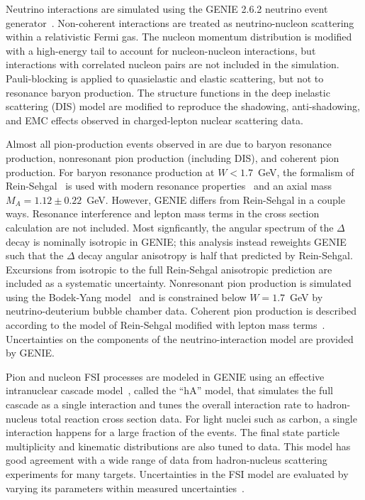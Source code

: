 Neutrino interactions are simulated using the GENIE 2.6.2 neutrino event generator~\cite{Andreopoulos201087}.  Non-coherent interactions 
are treated as neutrino-nucleon scattering within a relativistic Fermi gas.  The nucleon momentum distribution is 
modified with a high-energy tail to account for nucleon-nucleon interactions, but interactions with correlated 
nucleon pairs are not included in the simulation.  Pauli-blocking is applied to quasielastic and elastic scattering, but not to 
resonance baryon production.  The structure functions in the deep inelastic scattering (DIS) model are modified to reproduce 
the shadowing, anti-shadowing, and EMC effects observed in charged-lepton nuclear scattering data.

Almost all pion-production events observed in \minerva are due to baryon resonance production, nonresonant pion production (including DIS), 
and coherent pion production.  For baryon resonance production at $W<1.7$~GeV, the formalism of 
Rein-Sehgal~\cite{Rein:1980wg} is used with modern resonance properties~\cite{pdg} and an axial mass $M_{A}=1.12\pm0.22$~GeV.  
However, GENIE differs from Rein-Sehgal in a couple ways. Resonance interference and lepton mass terms in the 
cross section calculation are not included. 
Most signficantly, the angular spectrum of the $\Delta$ decay is nominally isotropic in GENIE; this analysis instead reweights GENIE such 
that the $\Delta$ decay angular anisotropy is half that predicted by 
Rein-Sehgal.  Excursions from isotropic to the full Rein-Sehgal anisotropic prediction are included as a systematic uncertainty.
Nonresonant pion production is simulated using the Bodek-Yang 
model~\cite {Bodek:2004pc} and is constrained below $W=1.7$~GeV by 
neutrino-deuterium bubble chamber data. Coherent pion production is described according to the 
model of Rein-Sehgal modified with lepton mass terms~\cite{Rein:2007}.  Uncertainties on the components of the neutrino-interaction model are 
provided by GENIE. 

Pion and nucleon FSI processes are modeled in GENIE using an effective
intranuclear cascade model~\cite{Dytman:2011zz}, called the ``hA'' model, that simulates the full
cascade as a single interaction and tunes the overall interaction rate
to hadron-nucleus total reaction cross section data.  For 
light nuclei such as carbon, a single interaction happens for a large
fraction of the events.  The final state particle multiplicity and kinematic 
distributions are also tuned to data.  
This model has good agreement with a wide range 
of data from hadron-nucleus scattering experiments for many 
targets. 
Uncertainties in the FSI model are evaluated by varying its parameters
within measured uncertainties~\cite{Lee:2002eq,Ashery:1981tq}.


 




